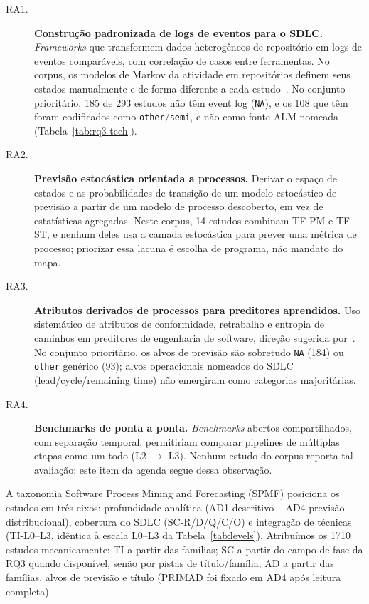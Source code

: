 \documentclass[preprint,12pt,authoryear=false]{elsarticle}
\newcommand{\PM}{TF-PM}
\newcommand{\ST}{TF-ST}
\begin{document}
\begin{description}
\item[RA1.] \textbf{Construção padronizada de logs de eventos para o SDLC.} \emph{Frameworks} que transformem dados heterogêneos de repositório em logs de eventos comparáveis, com correlação de casos entre ferramentas. No corpus, os modelos de Markov da atividade em repositórios definem seus estados manualmente e de forma diferente a cada estudo~\cite{jo2023,jo2024,ortu2023}. No conjunto prioritário, 185 de 293 estudos não têm event log (\texttt{NA}), e os 108 que têm foram codificados como \texttt{other}/\texttt{semi}, e não como fonte ALM nomeada (Tabela~\ref{tab:rq3-tech}).
\item[RA2.] \textbf{Previsão estocástica orientada a processos.} Derivar o espaço de estados e as probabilidades de transição de um modelo estocástico de previsão a partir de um modelo de processo descoberto, em vez de estatísticas agregadas. Neste corpus, 14 estudos combinam \PM{} e \ST{}, e nenhum deles usa a camada estocástica para prever uma métrica de processo; priorizar essa lacuna é escolha de programa, não mandato do mapa.
\item[RA3.] \textbf{Atributos derivados de processos para preditores aprendidos.} Uso sistemático de atributos de conformidade, retrabalho e entropia de caminhos em preditores de engenharia de software, direção sugerida por~\cite{caldeira2022,gupta2017}. No conjunto prioritário, os alvos de previsão são sobretudo \texttt{NA} (184) ou \texttt{other} genérico (93); alvos operacionais nomeados do SDLC (lead/cycle/remaining time) não emergiram como categorias majoritárias.
\item[RA4.] \textbf{Benchmarks de ponta a ponta.} \emph{Benchmarks} abertos compartilhados, com separação temporal, permitiriam comparar pipelines de múltiplas etapas como um todo (L2 $\rightarrow$ L3). Nenhum estudo do corpus reporta tal avaliação; este item da agenda segue dessa observação.
\end{description}

A taxonomia Software Process Mining and Forecasting (SPMF) posiciona os estudos em três eixos: profundidade analítica (AD1 descritivo -- AD4 previsão distribucional), cobertura do SDLC (SC-R/D/Q/C/O) e integração de técnicas (TI-L0--L3, idêntica à escala L0--L3 da Tabela~\ref{tab:levels}). Atribuímos os 1710 estudos mecanicamente: TI a partir das famílias; SC a partir do campo de fase da RQ3 quando disponível, senão por pistas de título/família; AD a partir das famílias, alvos de previsão e título (PRIMAD foi fixado em AD4 após leitura completa).
\end{document}
